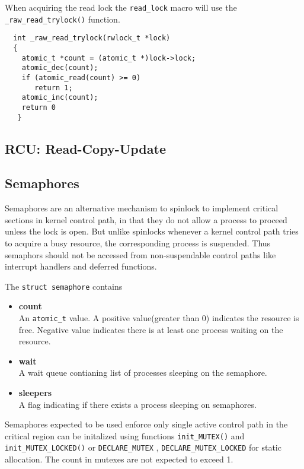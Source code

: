 \documentclass{article}
\begin{document}
When acquiring the read lock the \lstinline{read_lock} macro will use
the \lstinline{_raw_read_trylock()} function.

\begin{lstlisting}
  int _raw_read_trylock(rwlock_t *lock)
  {
    atomic_t *count = (atomic_t *)lock->lock;
    atomic_dec(count);
    if (atomic_read(count) >= 0)
       return 1;
    atomic_inc(count);
    return 0
   }
\end{lstlisting}


\subsection{RCU: Read-Copy-Update  }

\subsection{Semaphores}

Semaphores are an alternative mechanism to spinlock to implement
critical sections in kernel control path, in that they do not allow a
process to proceed unless the lock is open. But unlike spinlocks
whenever a kernel control path tries to acquire a busy resource, the
corresponding process is suspended. Thus semaphors should not be
accessed from non-suspendable control paths like interrupt handlers
and deferred functions.

The \lstinline{struct semaphore} contains

\begin{itemize}
  
\item \textbf{count} \\

  An \lstinline{atomic_t} value. A positive value(greater than 0)
  indicates the resource is free. Negative value indicates there is at
  least one process waiting on the resource.

\item \textbf{wait} \\

  A wait queue contianing list of processes sleeping on the semaphore.
  
\item \textbf{sleepers} \\
  A flag indicating if there exists a process sleeping on semaphores.    
\end{itemize}

Semaphores expected to be used enforce only single active control path
in the critical region can be initalized using functions
\lstinline{init_MUTEX()} and \lstinline{init_MUTEX_LOCKED()} or
\lstinline{DECLARE_MUTEX} , \lstinline{DECLARE_MUTEX_LOCKED} for
static allocation. The count in mutexes are not expected to exceed 1.
\end{document}
